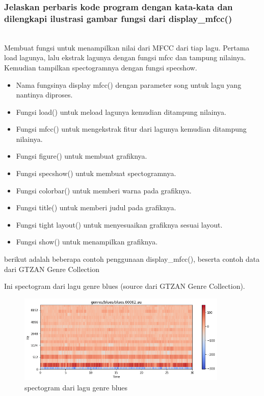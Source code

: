 \subsubsection{Jelaskan perbaris kode program dengan kata-kata dan dilengkapi ilustrasi gambar fungsi dari display\_mfcc()}
\hfill\\

Membuat fungsi untuk menampilkan nilai dari MFCC dari tiap lagu. Pertama load lagunya, lalu ekstrak lagunya dengan fungsi mfcc dan tampung nilainya. Kemudian tampilkan spectogramnya dengan fungsi specshow.
\begin{itemize}
\item Nama fungsinya display mfcc() dengan parameter song untuk lagu yang nantinya diproses.
\item Fungsi load() untuk meload lagunya kemudian ditampung nilainya.
\item Fungsi mfcc() untuk mengekstrak fitur dari lagunya kemudian ditampung nilainya.
\item Fungsi figure() untuk membuat grafiknya.
\item Fungsi specshow() untuk membuat spectogramnya.
\item Fungsi colorbar() untuk memberi warna pada grafiknya.
\item Fungsi title() untuk memberi judul pada grafiknya.
\item Fungsi tight layout() untuk menyesuaikan grafiknya sesuai layout.
\item Fungsi show() untuk menampilkan grafiknya.
\end{itemize}
berikut adalah beberapa contoh penggunaan display\_mfcc(), beserta contoh data dari GTZAN Genre Collection

Ini spectogram dari lagu genre blues (source dari GTZAN Genre Collection).

\begin{figure}[H]
	\centering
	\includegraphics[width=10cm]{figures/1174083/figures6/12.png}
	\caption{spectogram dari lagu genre blues}
\end{figure}

